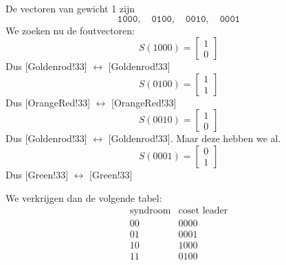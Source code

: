 \newline
De vectoren van gewicht 1 zijn
\begin{equation*}
    \mathtt{1000}, \quad \mathtt{0100}, \quad \mathtt{0010}, \quad \mathtt{0001}
\end{equation*}
We zoeken nu de foutvectoren:
\begin{equation*}
    S(1000) = \begin{bmatrix}
        1 \\ 0
    \end{bmatrix}
\end{equation*}
Dus [Goldenrod!33] $\longleftrightarrow$ [Goldenrod!33]
\begin{equation*}
    S(0100) = \begin{bmatrix}
        1 \\ 1
    \end{bmatrix}
\end{equation*}
Dus [OrangeRed!33] $\longleftrightarrow$ [OrangeRed!33]
\begin{equation*}
    S(0010) = \begin{bmatrix}
        1 \\ 0
    \end{bmatrix}
\end{equation*}
Dus [Goldenrod!33] $\longleftrightarrow$ [Goldenrod!33]. Maar deze hebben we al.
\begin{equation*}
    S(0001) = \begin{bmatrix}
        0 \\ 1
    \end{bmatrix}
\end{equation*}
Dus [Green!33] $\longleftrightarrow$ [Green!33]

We verkrijgen dan de volgende tabel:
\[
\begin{array}{c|c}
\text{syndroom} & \text{coset leader} \\
\hline
00 & 0000 \\
01 & 0001 \\
10 & 1000 \\
11 & 0100
\end{array}
\]

